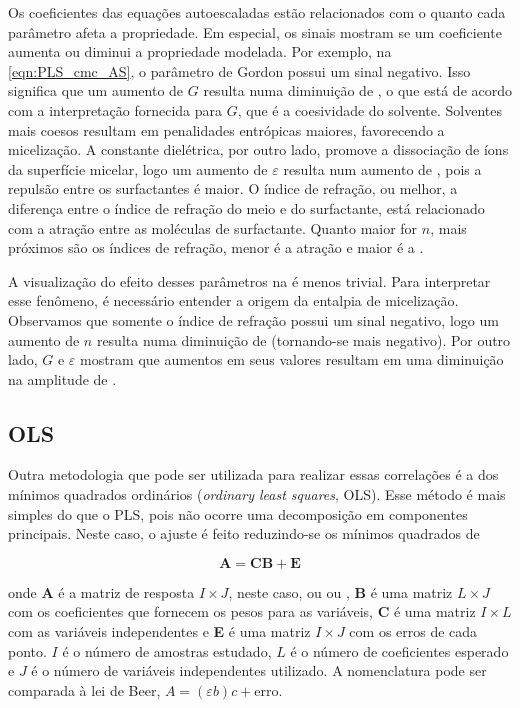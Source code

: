 		Os coeficientes das equações autoescaladas estão relacionados com o quanto cada parâmetro afeta a propriedade. Em especial, os sinais mostram se um coeficiente aumenta ou diminui a propriedade modelada. Por exemplo, na \autoref{eqn:PLS_cmc_AS}, o parâmetro de Gordon possui um sinal negativo. Isso significa que um aumento de \(G\) resulta numa diminuição de \cmc, o que está de acordo com a interpretação fornecida para \(G\), que é a coesividade do solvente. Solventes mais coesos resultam em penalidades entrópicas maiores, favorecendo a micelização. A constante dielétrica, por outro lado, promove a dissociação de íons da superfície micelar, logo um aumento de \(\varepsilon\) resulta num aumento de \cmc, pois a repulsão entre os surfactantes é maior. O índice de refração, ou melhor, a diferença entre o índice de refração do meio e do surfactante, está relacionado com a atração entre as moléculas de surfactante. Quanto maior for \(n\), mais próximos são os índices de refração, menor é a atração e maior é a \cmc.
		
		A visualização do efeito desses parâmetros na \DHmic{} é menos trivial. Para interpretar esse fenômeno, é necessário entender a origem da entalpia de micelização. %
		Observamos que somente o índice de refração possui um sinal negativo, logo um aumento de \(n\) resulta numa diminuição de \DHmic{} (tornando-se mais negativo). Por outro lado, \(G\) e \(\varepsilon\) mostram que aumentos em seus valores resultam em uma diminuição na amplitude de \DHmic. 
		
		\vfill
		
		\FloatBarrier
		\subsection{OLS} 
		
		Outra metodologia que pode ser utilizada para realizar essas correlações é a dos mínimos quadrados ordinários (\emph{ordinary least squares}, OLS). Esse método é mais simples do que o PLS, pois não ocorre uma decomposição em componentes principais. Neste caso, o ajuste é feito reduzindo-se os mínimos quadrados de \cite{MarciaQuimiometria}
	
		\begin{equation}
			\mathbf{A} = \mathbf{CB} + \mathbf{E}
			\label{eqn:ols_modelo_matricial}
		\end{equation}
		
		\noindent onde \textbf{A} é a matriz de resposta \(I \times J\), neste caso, ou \cmc{} ou \DHmic, \textbf{B} é uma matriz \(L \times J\) com os coeficientes que fornecem os pesos para as variáveis, \textbf{C} é uma matriz \(I \times L\) com as variáveis independentes e \textbf{E} é uma matriz \(I \times J\) com os erros de cada ponto. \(I\) é o número de amostras estudado, \(L\) é o número de coeficientes esperado e \(J\) é o número de variáveis independentes utilizado. A nomenclatura pode ser comparada à lei de Beer, \(A = (\varepsilon b)c + \mathrm{erro}\).
		
